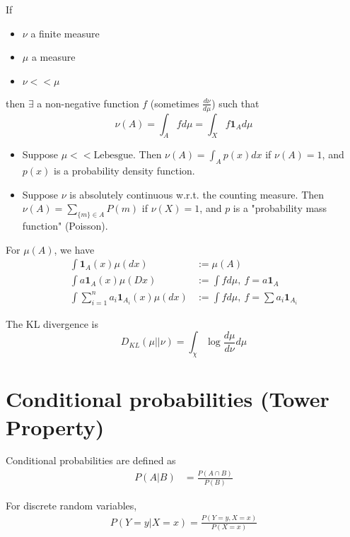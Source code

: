 \documentclass[twoside]{article}
\begin{document}
\begin{theorem}
  If 
  \begin{itemize}
    \item $\nu$ a finite measure
    \item $\mu$ a measure
    \item $\nu << \mu$
  \end{itemize}
  then $\exists$ a non-negative function $f$ (sometimes $\frac{d\nu}{d\mu}$)
  such that \[\nu(A) = \int_A f d\mu = \int_X f \mathbf{1}_A d\mu\]
\end{theorem}

\begin{itemize}
  \item Suppose $\mu << \text{Lebesgue}$. Then $\nu(A) = \int_A p(x) dx$ if $\nu(A) =
1$, and $p(x)$ is a probability density function.

  \item Suppose $\nu$ is absolutely continuous w.r.t. the counting measure. Then $\nu(A)
= \sum_{\{m\} \in A} P(m)$ if $\nu(X) = 1$, and $p$ is a "probability mass
function" (Poisson).
\end{itemize}

For $\mu(A)$, we have
\begin{align*}
   \int \mathbf{1}_A(x) \mu(dx) &:= \mu(A) \\
   \int a \mathbf{1}_A(x) \mu(Dx) &:= \int f d\mu,\ f = a \mathbf{1}_A \\
   \int \sum_{i=1}^n a_i \mathbf{1}_{A_i}(x) \mu(dx) &:= \int f d\mu,\ f = \sum
   a_i \mathbf{1}_{A_i}
\end{align*}

\begin{definition}
  The KL divergence is
  \[ D_{KL}(\mu || \nu) = \int_\chi \log \frac{d\mu}{d\nu} d\mu \]
\end{definition}

\section{Conditional probabilities (Tower Property)}

Conditional probabilities are defined as
\begin{align*}
  P(A | B) &= \frac{P(A \cap B)}{P(B)} 
\end{align*}

For discrete random variables,
\begin{align*}
  P(Y = y | X = x) = \frac{P(Y = y, X = x)}{P(X = x)}
\end{align*}
\end{document}
